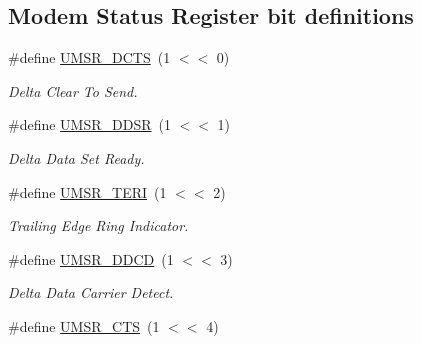 \subsection*{Modem Status Register bit definitions}
\begin{DoxyCompactItemize}
\item 
\mbox{\label{group__rtl22xx__uart_gaa46fcfd85876c8b7e51e80f7f3d4f0d7}} 
\#define \mbox{\hyperlink{group__rtl22xx__uart_gaa46fcfd85876c8b7e51e80f7f3d4f0d7}{U\+M\+S\+R\+\_\+\+D\+C\+TS}}~(1 $<$$<$ 0)
\begin{DoxyCompactList}\small\item\em Delta Clear To Send. \end{DoxyCompactList}\item 
\mbox{\label{group__rtl22xx__uart_gaa284e03d74be4f0247375b1e389711b6}} 
\#define \mbox{\hyperlink{group__rtl22xx__uart_gaa284e03d74be4f0247375b1e389711b6}{U\+M\+S\+R\+\_\+\+D\+D\+SR}}~(1 $<$$<$ 1)
\begin{DoxyCompactList}\small\item\em Delta Data Set Ready. \end{DoxyCompactList}\item 
\mbox{\label{group__rtl22xx__uart_gaca5396e21a5387c929fd07e880eb5860}} 
\#define \mbox{\hyperlink{group__rtl22xx__uart_gaca5396e21a5387c929fd07e880eb5860}{U\+M\+S\+R\+\_\+\+T\+E\+RI}}~(1 $<$$<$ 2)
\begin{DoxyCompactList}\small\item\em Trailing Edge Ring Indicator. \end{DoxyCompactList}\item 
\mbox{\label{group__rtl22xx__uart_ga2a5f308d80c02092a83753876c165ab0}} 
\#define \mbox{\hyperlink{group__rtl22xx__uart_ga2a5f308d80c02092a83753876c165ab0}{U\+M\+S\+R\+\_\+\+D\+D\+CD}}~(1 $<$$<$ 3)
\begin{DoxyCompactList}\small\item\em Delta Data Carrier Detect. \end{DoxyCompactList}\item 
\mbox{\label{group__rtl22xx__uart_ga337942bc140fa759ed23fb2c4d61ca1b}} 
\#define \mbox{\hyperlink{group__rtl22xx__uart_ga337942bc140fa759ed23fb2c4d61ca1b}{U\+M\+S\+R\+\_\+\+C\+TS}}~(1 $<$$<$ 4)
$$
\end{DoxyCompactItemize}
